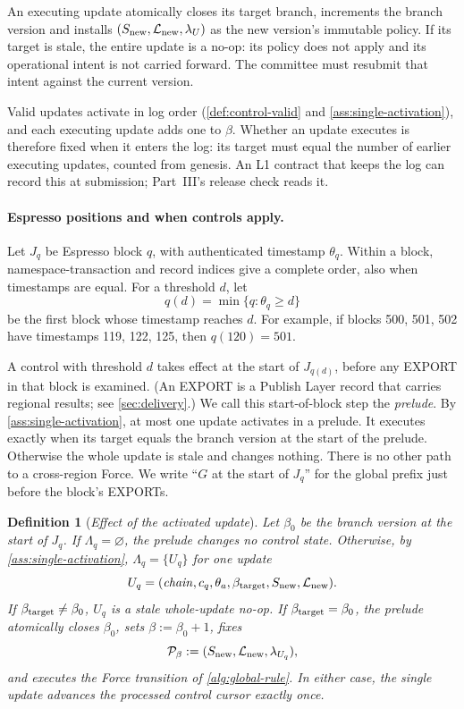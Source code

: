 \documentclass[11pt,a4paper]{article}
\newcommand{\defterm}[1]{\textcolor{rrBlue}{\textit{#1}}}
\newtheorem{definition}{Definition}[section]
\begin{document}
An executing update atomically closes its target branch, increments the
branch version and installs $(S_{\rm new},\mathcal L_{\rm new},\lambda_U)$
as the new version's immutable policy.  If its target is stale, the entire update is a no-op:
its policy does not apply and its operational intent is not carried
forward. The committee must resubmit that intent against the current
version.

Valid updates activate in log order (\cref{def:control-valid} and
\cref{ass:single-activation}), and each executing update adds one to
$\beta$. Whether an update executes is therefore fixed when it enters the
log: its target must equal the number of earlier executing updates,
counted from genesis. An L1 contract that keeps the log can record this
at submission; Part~III's release check reads it.

\paragraph{Espresso positions and when controls apply.}
Let $J_q$ be Espresso block $q$, with authenticated timestamp $\theta_q$.
Within a block, namespace-transaction and record indices give a complete
order, also when timestamps are equal. For a threshold $d$, let
\[
 q(d)=\min\{q:\theta_q\ge d\}
\]
be the first block whose timestamp reaches $d$. For example, if blocks
500, 501, 502 have timestamps 119, 122, 125, then $q(120)=501$.

A control with threshold $d$ takes effect at the start of $J_{q(d)}$,
before any EXPORT in that block is examined. (An EXPORT is a Publish
Layer record that carries regional results; see \cref{sec:delivery}.) We
call this start-of-block step the \defterm{prelude}. By
\cref{ass:single-activation}, at most one update activates in a prelude.
It executes exactly when its target equals the branch version at the
start of the prelude. Otherwise the whole update is stale and changes
nothing. There is no other path to a cross-region Force. We write ``$G$
at the start of $J_q$'' for the global prefix just before the block's
EXPORTs.

\begin{definition}[\defterm{Effect of the activated update}]
\label{def:control-effect}
Let $\beta_0$ be the branch version at the start of $J_q$. If
$\Lambda_q=\varnothing$, the prelude changes no control state. Otherwise,
by \cref{ass:single-activation}, $\Lambda_q=\{U_q\}$ for one update
\[
 U_q=(\mathit{chain},c_q,\theta_a,\beta_{\rm target},S_{\rm new},
      \mathcal L_{\rm new}).
\]
If $\beta_{\rm target}\ne\beta_0$, $U_q$ is a stale whole-update no-op.
If $\beta_{\rm target}=\beta_0$, the prelude atomically closes $\beta_0$,
sets $\beta:=\beta_0+1$, fixes
\[
 \mathcal P_{\beta}:=(S_{\rm new},\mathcal L_{\rm new},\lambda_{U_q}),
\]
and executes the Force transition of \cref{alg:global-rule}. In either
case, the single update advances the processed control cursor exactly
once.
\end{definition}
\end{document}
